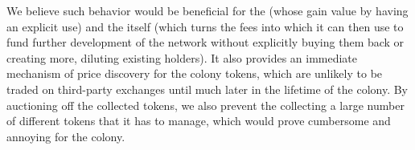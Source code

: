 We believe such behavior would be beneficial for the \rcths (whose \rcts gain value by having an explicit use) and the \rc itself (which turns the fees into \rcts which it can then use to fund further development of the network without explicitly buying them back or creating more, diluting existing holders). It also provides an immediate mechanism of price discovery for the colony tokens, which are unlikely to be traded on third-party exchanges until much later in the lifetime of the colony. By auctioning off the collected tokens, we also prevent the \rc collecting a large number of different tokens that it has to manage, which would prove cumbersome and annoying for the colony.



